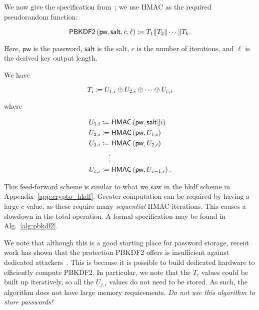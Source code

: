 

We now give the specification from~\cite{rfc8018};
we use \textsf{HMAC} as the required pseudorandom function:

\begin{equation}
    \textsf{PBKDF2}\left( \textsf{pw}, \textsf{salt}, c, \ell \right)
        \coloneqq{} T_{1} \| T_{2} \| \cdots \| T_{k}.
\end{equation}

\noindent
Here, $\textsf{pw}$ is the password,
$\textsf{salt}$ is the \gls{salt},
$c$ is the number of iterations,
and $\ell$ is the derived key output length.

We have

\begin{equation}
    T_{i} \coloneqq{} U_{1,i} \oplus U_{2,i} \oplus \cdots \oplus U_{c,i}
\end{equation}

\noindent
where

\begin{align}
    U_{1,i} &\coloneqq{} \textsf{HMAC}\left( \textsf{pw}, \textsf{salt} \| i \right)
        \nonumber\\
    U_{2,i} &\coloneqq{} \textsf{HMAC}\left( \textsf{pw}, U_{1,i} \right)
        \nonumber\\
    U_{3,i} &\coloneqq{} \textsf{HMAC}\left( \textsf{pw}, U_{2,i} \right)
        \nonumber\\
        &\quad \vdots \nonumber\\
    U_{c,i} &\coloneqq{} \textsf{HMAC}\left( \textsf{pw}, U_{c-1,i} \right).
\end{align}

\noindent
This feed-forward scheme is similar to what we saw in the \gls{hkdf}
scheme in Appendix~\ref{app:crypto_hkdf}.
Greater computation can be required by having a large $c$ value,
as these require many \emph{sequential} \textsf{HMAC} iterations.
This causes a slowdown in the total operation.
A formal specification may be found in Alg.~\ref{alg:pbkdf2}.

We note that although this is a good starting place for password storage,
recent work has shown that the protection PBKDF2 offers
is insufficient against dedicated attackers~\cite{blocki2018economics}.
This is because it is possible to build dedicated hardware
to efficiently compute PBKDF2.
In particular, we note that the $T_{i}$ values could be built up
iteratively, so all the $U_{j,i}$ values do not need to be stored.
As such, the algorithm does not have large memory requirements.
\emph{Do not use this algorithm to store passwords!}


